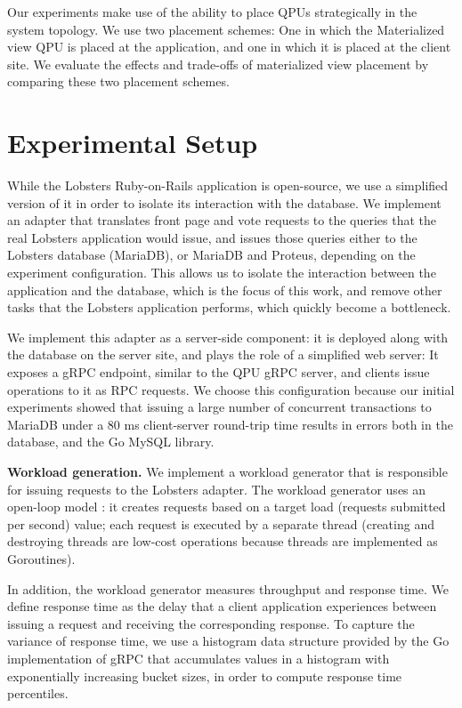 Our experiments  make use of the ability to place QPUs strategically in the system topology.
We use two placement schemes:
One in which the Materialized view QPU is placed at the application, and one in which it is placed at
the client site.
We evaluate the effects and trade-offs of materialized view placement by comparing these two placement schemes.


\section{Experimental Setup}
\label{sec:eval_setup}

While the Lobsters Ruby-on-Rails application is open-source,
we use a simplified version of it in order to isolate its interaction with the database.
We implement an adapter that translates front page and vote requests to the queries that the real
Lobsters application would issue, and issues those queries either to the Lobsters database (MariaDB),
or MariaDB and Proteus, depending on the experiment configuration.
This allows us to isolate the interaction between the application and the database, which is the focus of this work,
and remove other tasks that the Lobsters application performs, which quickly become a bottleneck.

We implement this adapter as a server-side component:
it is deployed along with the database on the server site, and plays the role of a simplified web server:
It exposes a gRPC endpoint, similar to the QPU gRPC server, and clients issue operations to it as RPC requests.
We choose this configuration because our initial experiments showed that issuing a large number of concurrent transactions
to MariaDB under a 80 ms client-server round-trip time results in errors both in the database,
and the Go MySQL library.

\bigskip
\noindent
\textbf{Workload generation.}
We implement a workload generator \cite{lobsters:bench} that is responsible for issuing
requests to the Lobsters adapter.
The workload generator uses an open-loop model \cite{schroeder:cautionarytale}:
it creates requests based on a target load (requests submitted per second) value;
each request is executed by a separate thread (creating and destroying threads are low-cost operations because threads are
implemented as Goroutines).

In addition, the workload generator measures throughput and response time.
We define response time as the delay that a client application experiences between issuing a request and receiving the
corresponding response.
To capture the variance of response time, we use a histogram data structure provided by the Go implementation of gRPC \cite{grpcgo:histogram}
that accumulates values in a histogram with exponentially increasing bucket sizes, in order to compute response time percentiles.

